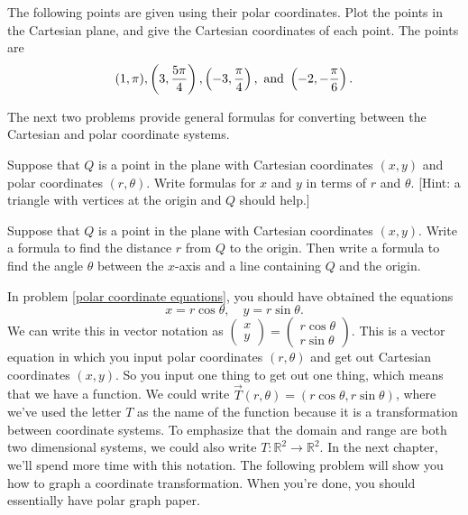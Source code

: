 \begin{problem}  
The following points are given using their polar coordinates.  Plot the points in the Cartesian plane, and give the Cartesian coordinates of each point. The points are
$$
(1,\pi), 
\displaystyle \left( 3,\frac{5\pi}{4}\right),
\displaystyle \left( -3,\frac{\pi}{4}\right),\text{ and }
\displaystyle \left( -2,-\frac{\pi}{6}\right).$$
\end{problem}

The next two problems provide general formulas for converting between the Cartesian and polar coordinate systems.

\begin{problem}\label{polar coordinate equations}  
Suppose that $Q$ is a point in the plane with Cartesian coordinates $(x,y)$ and polar coordinates $(r,\theta)$.  Write formulas for $x$ and $y$ in terms of $r$ and $\theta$. [Hint: a triangle with vertices at the origin and $Q$ should help.]
\end{problem}

\begin{problem} 
Suppose that $Q$ is a point in the plane with Cartesian coordinates $(x,y)$.  Write a formula to find the distance $r$ from $Q$ to the origin. Then write a formula to find the angle $\theta$ between the $x$-axis and a line containing $Q$ and the origin.
\end{problem}

In problem \ref{polar coordinate equations}, you should have obtained the equations 
$$x=r\cos\theta, \quad y=r\sin\theta.$$
We can write this in vector notation as $\begin{pmatrix}x\\y\end{pmatrix}=\begin{pmatrix}r\cos\theta\\ r\sin\theta\end{pmatrix}$.
This is a vector equation in which you input polar coordinates $(r,\theta)$ and get out Cartesian coordinates $(x,y)$.  
So you input one thing to get out one thing, which means that we have a function.  
We could write $\vec T(r,\theta) = (r\cos\theta,r\sin\theta)$, where we've used the letter $T$ as the name of the function because it is a transformation between coordinate systems. 
To emphasize that the domain and range are both two dimensional systems, we could also write $T:\mathbb{R}^2\to\mathbb{R}^2$. In the next chapter, we'll spend more time with this notation. The following problem will show you how to graph a coordinate transformation.  When you're done, you should essentially have polar graph paper.

